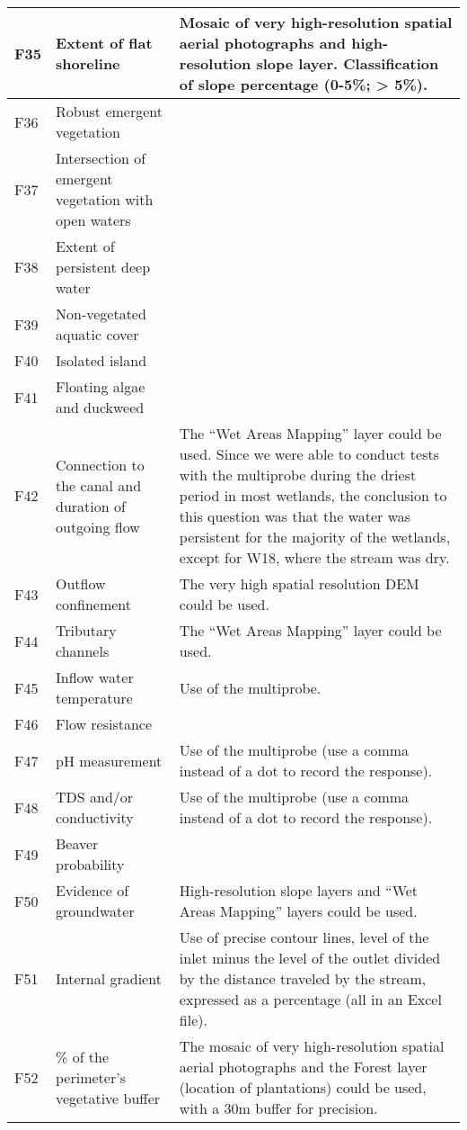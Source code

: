 \begin{longtable}{|l|p{3cm}|p{10cm}|}
    F35 & Extent of flat shoreline & Mosaic of very high-resolution spatial aerial photographs and high-resolution slope layer. Classification of slope percentage (0-5\%; > 5\%). \\ \hline
    F36 & Robust emergent vegetation & \\ \hline
    F37 & Intersection of emergent vegetation with open waters & \\ \hline
    F38 & Extent of persistent deep water & \\ \hline
    F39 & Non-vegetated aquatic cover & \\ \hline
    F40 & Isolated island & \\ \hline
    F41 & Floating algae and duckweed & \\ \hline
    F42 & Connection to the canal and duration of outgoing flow & The “Wet Areas Mapping” layer could be used. Since we were able to conduct tests with the multiprobe during the driest period in most wetlands, the conclusion to this question was that the water was persistent for the majority of the wetlands, except for W18, where the stream was dry. \\ \hline
    F43 & Outflow confinement & The very high spatial resolution DEM could be used. \\ \hline
    F44 & Tributary channels & The “Wet Areas Mapping” layer could be used. \\ \hline
    F45 & Inflow water temperature & Use of the multiprobe. \\ \hline
    F46 & Flow resistance & \\ \hline
    F47 & pH measurement & Use of the multiprobe (use a comma instead of a dot to record the response). \\ \hline
    F48 & TDS and/or conductivity & Use of the multiprobe (use a comma instead of a dot to record the response). \\ \hline
    F49 & Beaver probability & \\ \hline
    F50 & Evidence of groundwater & High-resolution slope layers and “Wet Areas Mapping” layers could be used. \\ \hline
    F51 & Internal gradient & Use of precise contour lines, level of the inlet minus the level of the outlet divided by the distance traveled by the stream, expressed as a percentage (all in an Excel file). \\ \hline
    F52 & \% of the perimeter's vegetative buffer & The mosaic of very high-resolution spatial aerial photographs and the Forest layer (location of plantations) could be used, with a 30m buffer for precision. \\ \hline

\end{longtable}
